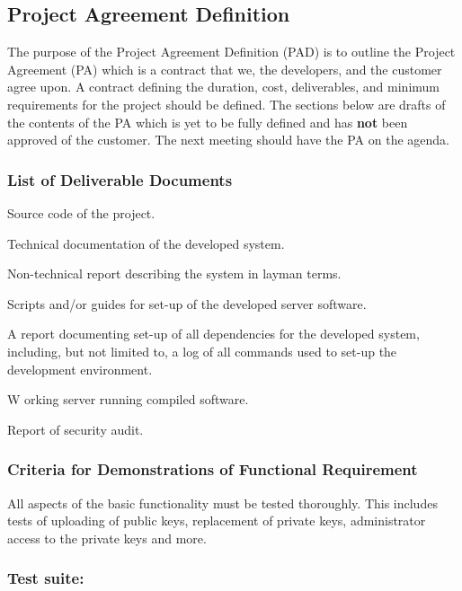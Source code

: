 \documentclass[11pt,a4paper]{article}
\let\OldItem\item
\newcommand{\SubItemStart}[1]{%
    \let\item\SubItemEnd
    \begin{SubItemList}[resume]%
        \OldItem #1%
}
\newcommand{\SubItemMiddle}[1]{%
    \OldItem #1%
}
\newcommand{\SubItemEnd}[1]{%
    \end{SubItemList}%
    \let\item\OldItem
    \item #1%
}
\newcommand*{\SubItem}[1]{%
    \let\SubItem\SubItemMiddle%
    \SubItemStart{#1}%
}%
\begin{document}
\subsection{Project Agreement Definition}
The purpose of the Project Agreement Definition (PAD) is to outline the Project Agreement (PA) which is a contract that we, the developers, and the customer agree upon. A contract defining the duration, cost, deliverables, and minimum requirements for the project should be defined. The sections below are drafts of the contents of the PA which is yet to be fully defined and has \textbf{not} been approved of the customer. The next meeting should have the PA on the agenda.
\subsubsection{List of Deliverable Documents}\label{sec:deliverables}
\begin{itemize}
\item Source code of the project.
\item Technical documentation of the developed system.
\item Non-technical report describing the system in layman terms.
\item Scripts and/or guides for set-up of the developed server software.
\SubItem A report documenting set-up of all dependencies for the developed system, including, but not limited to, a log of all commands used to set-up the development environment.
\item Working server running compiled software.
\item Report of security audit.
\end{itemize}
\subsubsection{Criteria for Demonstrations of Functional Requirement}
All aspects of the basic functionality must be tested thoroughly. This includes tests of uploading of public keys, replacement of private keys, administrator access to the private keys and more.

\subsubsection{Test suite:}
\end{document}
